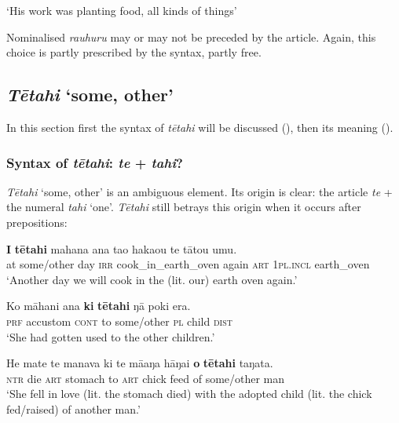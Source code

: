\glt
‘His work was planting food, all kinds of things’ \textstyleExampleref{[R444.015–016]}
\z

Nominalised \textit{rauhuru} may or may not be preceded by the article. Again, this choice is partly prescribed by the syntax, partly free. 
\subsection{\textit{Tētahi} ‘some, other’}\label{sec:4.4.6}
In this section first the syntax of \textit{tētahi} will be discussed (), then its meaning ().

\subsubsection[Syntax of tētahi: te + tahi?]{Syntax of \textit{tētahi}: \textit{te} + \textit{tahi}?}\label{sec:4.4.6.1}

\textit{Tētahi} ‘some, other’ is an ambiguous element. Its origin is clear: the article \textit{te} + the numeral \textit{tahi} ‘one’. \textit{Tētahi} still betrays this origin when it occurs after prepositions:

\ea\label{ex:4.77}
\gll \textbf{{\ꞌ}I} \textbf{tētahi} mahana ana ta{\ꞌ}o haka{\ꞌ}ou te tātou {\ꞌ}umu. \\
at some/other day \textsc{irr} cook\_in\_earth\_oven again \textsc{art} \textsc{1pl.incl} earth\_oven \\

\glt 
‘Another day we will cook in the (lit. our) earth oven again.’ \textstyleExampleref{[R333.546]} 
\z

\ea\label{ex:4.78}
\gll Ko māhani {\ꞌ}ana \textbf{ki} \textbf{tētahi} ŋā poki era. \\
\textsc{prf} accustom \textsc{cont} to some/other \textsc{pl} child \textsc{dist} \\

\glt 
‘She had gotten used to the other children.’ \textstyleExampleref{[R151.018]} 
\z

\ea\label{ex:4.79}
\gll He mate te manava ki te mā{\ꞌ}aŋa hāŋai \textbf{o} \textbf{tētahi} taŋata. \\
\textsc{ntr} die \textsc{art} stomach to \textsc{art} chick feed of some/other man \\

\glt
‘She fell in love (lit. the stomach died) with the adopted child (lit. the chick fed/raised) of another man.’ \textstyleExampleref{[Mtx-5-04.002]}
\z

